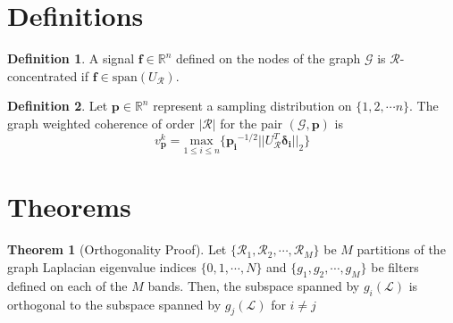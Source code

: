 \documentclass[a4paper]{article}
\newcommand{\R}{\mathcal{R}}
\newcommand{\RR}{\mathbb{R}}
\newcommand{\N}{\mathbb{N}}
\newcommand{\G}{\mathcal{G}}
\newcommand{\La}{\mathcal{L}}
\newcommand{\vv}{\mathit{v}}
\theoremstyle{definition}
\newtheorem*{definition}{Definition}
\newtheorem*{thm}{Theorem}
\begin{document}
\medskip

\section{Definitions}

\begin{definition}
A signal $\bm{f} \in \RR^n$ defined on the nodes of the graph $\G$ is $\R$-concentrated if $\bm{f} \in \text{span}(U_{\R})$.
\end{definition}

\begin{definition}
Let $\bm{p} \in \RR^{n}$ represent a sampling distribution on $\{1,2,\cdots n\}$. The graph weighted coherence of order $|\R| $ for the pair $(\G, \bm{p})$ is
$$ \vv^k_{\bm{p}} = \underset{1\leq i\leq n}{\text{ max }} \{\bm{p_i}^{-1/2} ||U_{\R}^T \bm{\delta_i} ||_2\}$$

\end{definition}

\section{Theorems}
\begin{thm}[Orthogonality Proof]

Let $\{\R_1, \R_2, \cdots, \R_M\}$ be $M$ partitions of the graph Laplacian eigenvalue indices $\{0, 1, \cdots,  N \}$ and $\{g_1, g_2, \cdots, g_M \}$ be filters defined on each of the $M$ bands. Then, the subspace spanned by $g_i(\La)$ is orthogonal to the subspace spanned by $g_j(\La)$ for $i \neq j$

\end{thm}
\end{document}
